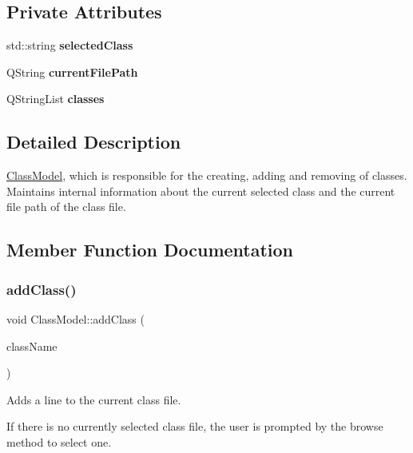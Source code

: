 \subsection*{Private Attributes}
\begin{DoxyCompactItemize}
\item 
\mbox{\label{classClassModel_a3f55a12cc009fa4a06cd6c82d1ba2a25}} 
std\+::string {\bfseries selected\+Class}
\item 
\mbox{\label{classClassModel_a0fbc77cdbd9d9bc73720a83e21b36bc5}} 
Q\+String {\bfseries current\+File\+Path}
\item 
\mbox{\label{classClassModel_aa656a0e8e8f9e18a361b427700098405}} 
Q\+String\+List {\bfseries classes}
\end{DoxyCompactItemize}


\subsection{Detailed Description}
\hyperlink{classClassModel}{Class\+Model}, which is responsible for the creating, adding and removing of classes. Maintains internal information about the current selected class and the current file path of the class file. 

\subsection{Member Function Documentation}
\mbox{\label{classClassModel_ab96bae16ed8f02abf2eca0d7b89a8a62}} 
\subsubsection{\texorpdfstring{add\+Class()}{addClass()}}
{\footnotesize\ttfamily void Class\+Model\+::add\+Class (\begin{DoxyParamCaption}\item[{Q\+String}]{class\+Name }\end{DoxyParamCaption})}



Adds a line to the current class file. 

If there is no currently selected class file, the user is prompted by the browse method to select one.


